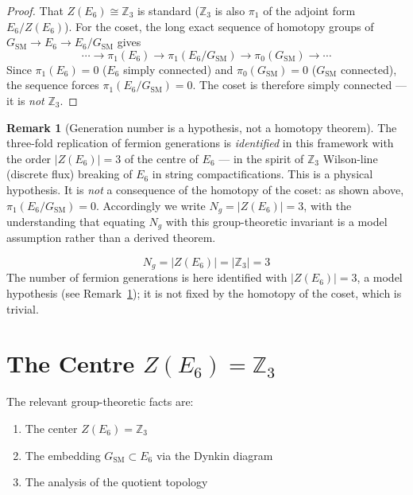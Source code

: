 \documentclass[11pt,a4paper,openright]{book}
\theoremstyle{plain}
\theoremstyle{definition}
\newtheorem{remark}[theorem]{Remark}
\newcommand{\SM}{\mathrm{SM}}
\newcommand{\Z}{\mathbb{Z}}
\begin{document}
\begin{proof}
That $Z(E_6) \cong \Z_3$ is standard ($\Z_3$ is also $\pi_1$ of the adjoint form $E_6/Z(E_6)$). For the coset, the long exact sequence of homotopy groups of $G_{\SM} \to E_6 \to E_6/G_{\SM}$ gives
\begin{equation}
\cdots \to \pi_1(E_6) \to \pi_1(E_6/G_{\SM}) \to \pi_0(G_{\SM}) \to \cdots
\end{equation}
Since $\pi_1(E_6) = 0$ ($E_6$ simply connected) and $\pi_0(G_{\SM}) = 0$ ($G_{\SM}$ connected), the sequence forces $\pi_1(E_6/G_{\SM}) = 0$. The coset is therefore simply connected --- it is \emph{not} $\Z_3$.
\end{proof}

\begin{remark}[Generation number is a hypothesis, not a homotopy theorem]
\label{rem:generations-hypothesis}
The three-fold replication of fermion generations is \emph{identified} in this framework with the order $|Z(E_6)| = 3$ of the centre of $E_6$ --- in the spirit of $\Z_3$ Wilson-line (discrete flux) breaking of $E_6$ in string compactifications. This is a physical hypothesis. It is \emph{not} a consequence of the homotopy of the coset: as shown above, $\pi_1(E_6/G_{\SM}) = 0$. Accordingly we write $N_g = |Z(E_6)| = 3$, with the understanding that equating $N_g$ with this group-theoretic invariant is a model assumption rather than a derived theorem.
\end{remark}

\begin{mainresult}
\begin{equation}
\boxed{N_g = |Z(E_6)| = |\Z_3| = 3}
\end{equation}
The number of fermion generations is here identified with $|Z(E_6)| = 3$, a model hypothesis (see Remark~\ref{rem:generations-hypothesis}); it is not fixed by the homotopy of the coset, which is trivial.
\end{mainresult}

\section{The Centre $Z(E_6) = \Z_3$}

The relevant group-theoretic facts are:
\begin{enumerate}
    \item The center $Z(E_6) = \Z_3$
    \item The embedding $G_{\SM} \subset E_6$ via the Dynkin diagram
    \item The analysis of the quotient topology
\end{enumerate}
\end{document}
